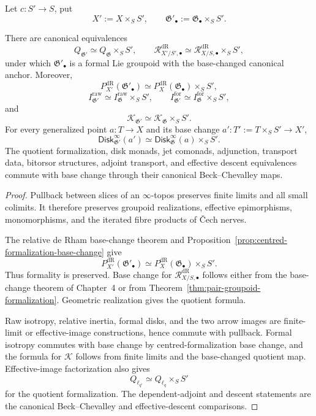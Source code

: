Let $c:S'\to S$, put
\[
    X':=X\times_SS',
    \qquad
    \mathfrak G'_\bullet
    :=
    \mathfrak G_\bullet\times_SS'.
\]

\begin{theorem}
\label{thm:formal-gpd-base-change}
There are canonical equivalences
\[
    Q_{\mathfrak G'}
    \simeq
    Q_{\mathfrak G}\times_SS',
    \qquad
    \mathcal R^{\mathrm{dR}}_{X'/S',\bullet}
    \simeq
    \mathcal R^{\mathrm{dR}}_{X/S,\bullet}\times_SS',
\]
under which $\mathfrak G'_\bullet$ is a formal Lie groupoid with the
base-changed canonical anchor.  Moreover,
\[
    P_{X'}^{\mathrm{dR}}(\mathfrak G'_\bullet)
    \simeq
    P_X^{\mathrm{dR}}(\mathfrak G_\bullet)\times_SS',
\]
\[
    I^{\mathrm{raw}}_{\mathfrak G'}
    \simeq
    I^{\mathrm{raw}}_{\mathfrak G}\times_SS',
    \qquad
    I^{\mathrm{for}}_{\mathfrak G'}
    \simeq
    I^{\mathrm{for}}_{\mathfrak G}\times_SS',
\]
and
\[
    \mathcal K_{\mathfrak G'}
    \simeq
    \mathcal K_{\mathfrak G}\times_SS'.
\]
For every generalized point $a:T\to X$ and its base change
$a':T':=T\times_SS'\to X'$,
\[
    \mathsf{Disk}^{\infty}_{\mathfrak G'}(a')
    \simeq
    \mathsf{Disk}^{\infty}_{\mathfrak G}(a)\times_SS'.
\]
The quotient formalization, disk monads, jet comonads, adjunction, transport
data, bitorsor structures, adjoint transport, and effective descent
equivalences commute with base change through their canonical
Beck--Chevalley maps.
\end{theorem}

\begin{proof}
Pullback between slices of an $\infty$-topos preserves finite limits and all
small colimits.  It therefore preserves groupoid realizations, effective
epimorphisms, monomorphisms, and the iterated fibre products of \v{C}ech nerves.

The relative de Rham base-change theorem and
Proposition~\ref{prop:centred-formalization-base-change} give
\[
    P_{X'}^{\mathrm{dR}}(\mathfrak G'_\bullet)
    \simeq
    P_X^{\mathrm{dR}}(\mathfrak G_\bullet)\times_SS'.
\]
Thus formality is preserved.  Base change for $\mathcal R^{\mathrm{dR}}_{X/S,\bullet}$ follows
either from the base-change theorem of Chapter~4 or from
Theorem~\ref{thm:pair-groupoid-formalization}.  Geometric realization gives
the quotient formula.

Raw isotropy, relative inertia, formal disks, and the two arrow images are
finite-limit or effective-image constructions, hence commute with pullback.
Formal isotropy commutes with base change by centred-formalization base change,
and the formula for $\mathcal K$ follows from finite limits and the
base-changed quotient map.  Effective-image factorization also gives
\[
    Q_{\ell_{q'}}
    \simeq
    Q_{\ell_q}\times_SS'
\]
for the quotient formalization.  The dependent-adjoint and descent
statements are the canonical Beck--Chevalley and effective-descent
comparisons.
\end{proof}


